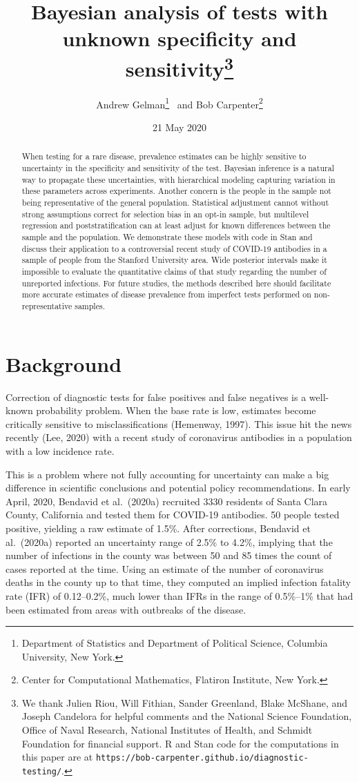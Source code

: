 \documentclass[11pt]{article}
\title{\bf Bayesian analysis of tests with unknown specificity and sensitivity\footnote{We thank Julien Riou, Will Fithian, Sander Greenland, Blake McShane, and Joseph Candelora for helpful comments and the National Science Foundation, Office of Naval Research, National Institutes of Health, and Schmidt Foundation for financial support.  R and Stan code for the computations in this paper are at {\tt https://bob-carpenter.github.io/diagnostic-testing/}.}\vspace{.1in}}
\author{Andrew Gelman\footnote{Department of Statistics and Department of
Political Science, Columbia University, New York.}  \ and Bob Carpenter\footnote{Center for Computational Mathematics, Flatiron Institute, New York.}
\vspace{.1in}}
\date{21 May 2020}
\begin{document}
\sloppy
\maketitle

\begin{abstract}
\noindent
When testing for a rare disease, prevalence estimates can be highly sensitive to uncertainty in the specificity and sensitivity of the test.  Bayesian inference is a natural way to propagate these uncertainties, with hierarchical modeling capturing variation in these parameters across experiments.  Another concern is the people in the sample not being representative of the general population.  Statistical adjustment cannot without strong assumptions correct for selection bias in an opt-in sample, but multilevel regression and poststratification can at least adjust for known differences between the sample and the population.  We demonstrate these models with code in Stan and discuss their application to a controversial recent study of COVID-19 antibodies in a sample of people from the Stanford University area.  Wide posterior intervals make it impossible to evaluate the quantitative claims of that study regarding the number of unreported infections.  For future studies, the methods described here should facilitate more accurate estimates of disease prevalence from imperfect tests performed on non-representative samples.
\end{abstract}

\section{Background}

Correction of diagnostic tests for false positives and false negatives is a well-known probability problem.  When the base rate is low, estimates become critically sensitive to misclassifications (Hemenway, 1997).  This issue hit the news recently (Lee, 2020) with a recent study of coronavirus antibodies in a population with a low incidence rate.

This is a problem where not fully accounting for uncertainty can make a big difference in scientific conclusions and potential policy recommendations.  In early April, 2020, Bendavid et al.\ (2020a) recruited 3330 residents of Santa Clara County, California and tested them for COVID-19 antibodies.  50 people tested positive, yielding a raw estimate of 1.5\%.  After corrections, Bendavid et al.\ (2020a) reported an uncertainty range of 2.5\% to 4.2\%, implying that the number of infections in the county was between 50 and 85 times the count of cases reported at the time.  Using an estimate of the number of coronavirus deaths in the county up to that time, they computed an implied infection fatality rate (IFR) of 0.12--0.2\%, much lower than IFRs in the range of 0.5\%--1\% that had been estimated from areas with outbreaks of the disease.
\end{document}

